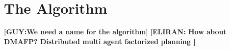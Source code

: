 \documentclass[letterpaper]{article} %
\newcommand{\eliran}[1]{\textbf{[\color{red}ELIRAN:#1]}}
\newcommand{\guy}[1]{\textbf{[\color{orange}GUY:#1]}}
\begin{document}
\section{The Algorithm}
\guy{We need a name for the algorithm} \eliran{ How about DMAFP? Distributed multi agent factorized planning }
%
\end{document}
